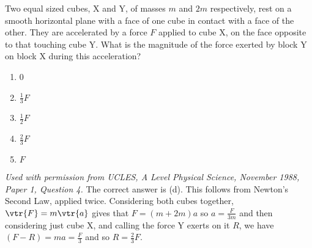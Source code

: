 
\begin{problem}  %
{Two equal sized cubes, X and Y, of masses $m$ and $2m$ respectively, rest on a smooth horizontal plane with a face of one cube in contact with a face of the other. They are accelerated by a force $F$ applied to cube X, on the face opposite to that touching cube Y. What is the magnitude of the force exerted by block Y on block X during this acceleration?
\begin{enumerate}
	\item 0
	\item $\frac{1}{3}F$
	\item $\frac{1}{2}F$
	\item $\frac{2}{3}F$ \answer
	\item $F$
\end{enumerate}
}
{\textit{Used with permission from UCLES, A Level Physical Science, November 1988, Paper 1, Question 4.}}
{The correct answer is (d). This follows from Newton's Second Law, applied twice. Considering both cubes together, $\vtr{F} = m\vtr{a}$ gives that $F = (m + 2m)a$ so $a = \frac{F}{3m}$ and then considering just cube X, and calling the force Y exerts on it $R$, we have $(F - R) = ma = \frac{F}{3}$ and so $R = \frac{2}{3}F$.}
\end{problem}